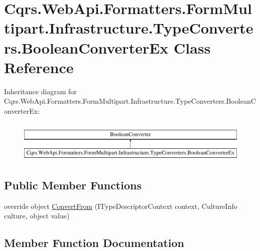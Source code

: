 \hypertarget{classCqrs_1_1WebApi_1_1Formatters_1_1FormMultipart_1_1Infrastructure_1_1TypeConverters_1_1BooleanConverterEx}{}\section{Cqrs.\+Web\+Api.\+Formatters.\+Form\+Multipart.\+Infrastructure.\+Type\+Converters.\+Boolean\+Converter\+Ex Class Reference}
\label{classCqrs_1_1WebApi_1_1Formatters_1_1FormMultipart_1_1Infrastructure_1_1TypeConverters_1_1BooleanConverterEx}
Inheritance diagram for Cqrs.\+Web\+Api.\+Formatters.\+Form\+Multipart.\+Infrastructure.\+Type\+Converters.\+Boolean\+Converter\+Ex\+:\begin{figure}[H]
\begin{center}
\leavevmode
\includegraphics[height=2.000000cm]{classCqrs_1_1WebApi_1_1Formatters_1_1FormMultipart_1_1Infrastructure_1_1TypeConverters_1_1BooleanConverterEx}
\end{center}
\end{figure}
\subsection*{Public Member Functions}
\begin{DoxyCompactItemize}
\item 
override object \hyperlink{classCqrs_1_1WebApi_1_1Formatters_1_1FormMultipart_1_1Infrastructure_1_1TypeConverters_1_1BooleanConverterEx_afac51ee1e191c7b27da72d7cf6f25fa7}{Convert\+From} (I\+Type\+Descriptor\+Context context, Culture\+Info culture, object value)
\end{DoxyCompactItemize}


\subsection{Member Function Documentation}
\mbox{\label{classCqrs_1_1WebApi_1_1Formatters_1_1FormMultipart_1_1Infrastructure_1_1TypeConverters_1_1BooleanConverterEx_afac51ee1e191c7b27da72d7cf6f25fa7}} 
